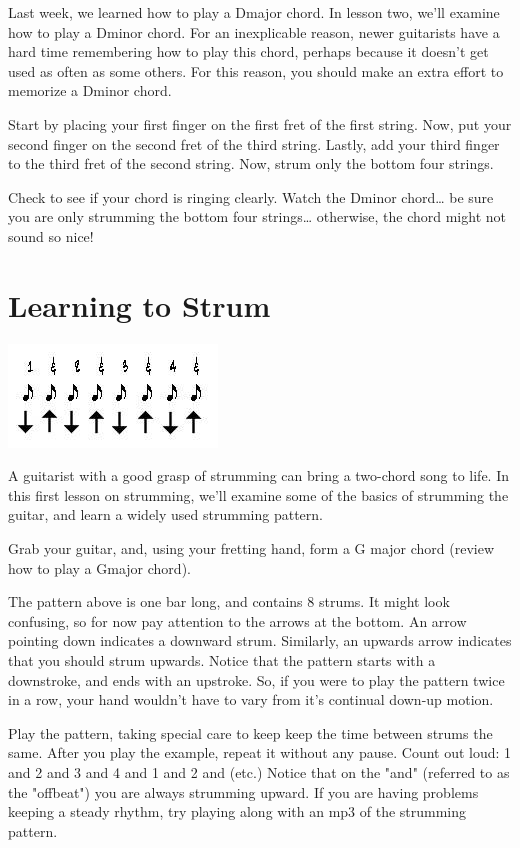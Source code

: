 Last week, we learned how to play a Dmajor chord. In lesson two, we'll examine
how to play a Dminor chord. For an inexplicable reason, newer guitarists have a
hard time remembering how to play this chord, perhaps because it doesn't get
used as often as some others. For this reason, you should make an extra effort
to memorize a Dminor chord.

Start by placing your first finger on the first fret of the first string. Now,
put your second finger on the second fret of the third string. Lastly, add your
third finger to the third fret of the second string. Now, strum only the bottom
four strings.

Check to see if your chord is ringing clearly. Watch the Dminor chord\ldots{} be
sure you are only strumming the bottom four strings\ldots{} otherwise, the chord
might not sound so nice!

\section{Learning to Strum}
\includegraphics{parttwo/strum1.jpg}

A guitarist with a good grasp of strumming can bring a two-chord song to life.
In this first lesson on strumming, we'll examine some of the basics of
strumming the guitar, and learn a widely used strumming pattern.

Grab your guitar, and, using your fretting hand, form a G major chord (review
how to play a Gmajor chord).

The pattern above is one bar long, and contains 8 strums. It might look
confusing, so for now pay attention to the arrows at the bottom. An arrow
pointing down indicates a downward strum. Similarly, an upwards arrow indicates
that you should strum upwards. Notice that the pattern starts with a
downstroke, and ends with an upstroke. So, if you were to play the pattern
twice in a row, your hand wouldn't have to vary from it's continual down-up
motion.

Play the pattern, taking special care to keep keep the time between strums the
same. After you play the example, repeat it without any pause. Count out loud:
1 and 2 and 3 and 4 and 1 and 2 and (etc.) Notice that on the "and" (referred
to as the "offbeat") you are always strumming upward. If you are having
problems keeping a steady rhythm, try playing along with an mp3 of the
strumming pattern.

